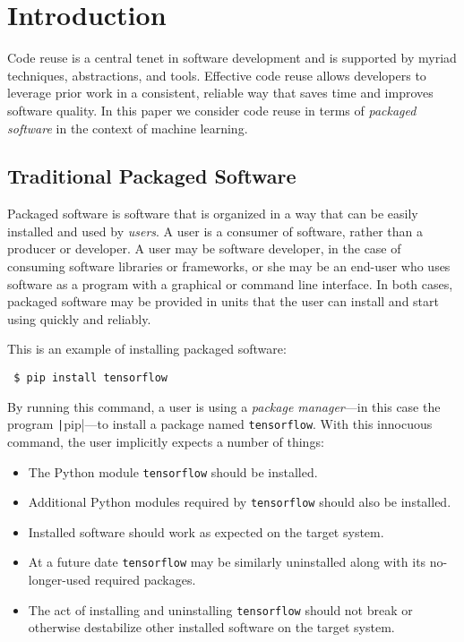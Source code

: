 \documentclass{article}
\begin{document}
\printAffiliationsAndNotice{}  %

\section{Introduction}

Code reuse is a central tenet in software development and is supported
by myriad techniques, abstractions, and tools. Effective code reuse
allows developers to leverage prior work in a consistent, reliable way
that saves time and improves software quality. In this paper we
consider code reuse in terms of \emph{packaged software} in the
context of machine learning.

\subsection{Traditional Packaged Software}

Packaged software is software that is organized in a way that can be
easily installed and used by \emph{users}. A user is a consumer of
software, rather than a producer or developer. A user may be software
developer, in the case of consuming software libraries or frameworks,
or she may be an end-user who uses software as a program with a
graphical or command line interface. In both cases, packaged software
may be provided in units that the user can install and start using
quickly and reliably.

This is an example of installing packaged software:

{\footnotesize
\begin{verbatim}
 $ pip install tensorflow
\end{verbatim}}

By running this command, a user is using a \emph{package manager}---in
this case the program \texttt|pip|---to install a package named
\verb|tensorflow|. With this innocuous command, the user implicitly expects
a number of things:

\begin{itemize}
\item The Python module \verb|tensorflow| should be installed.
\item Additional Python modules required by \verb|tensorflow| should
  also be installed.
\item Installed software should work as expected on the target system.
\item At a future date \verb|tensorflow| may be similarly uninstalled
  along with its no-longer-used required packages.
\item The act of installing and uninstalling \verb|tensorflow| should
  not break or otherwise destabilize other installed software on the
  target system.
\end{itemize}
\end{document}
